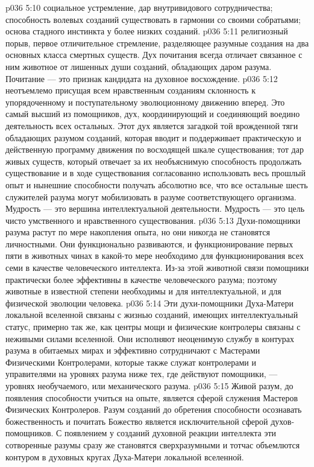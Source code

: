 \vs p036 5:10 \bibnobreakspace {} социальное устремление, дар внутривидового сотрудничества; способность волевых созданий существовать в гармонии со своими собратьями; основа стадного инстинкта у более низких созданий.
\vs p036 5:11 \bibnobreakspace {} религиозный порыв, первое отличительное стремление, разделяющее разумные создания на два основных класса смертных существ. Дух почитания всегда отличает связанное с ним животное от лишенных души созданий, обладающих даром разума. Почитание --- это признак кандидата на духовное восхождение.
\vs p036 5:12 \bibnobreakspace {} неотъемлемо присущая всем нравственным созданиям склонность к упорядоченному и поступательному эволюционному движению вперед. Это самый высший из помощников, дух, координирующий и соединяющий воедино деятельность всех остальных. Этот дух является загадкой той врожденной тяги обладающих разумом созданий, которая вводит и поддерживает практическую и действенную программу движения по восходящей шкале существования; тот дар живых существ, который отвечает за их необъяснимую способность продолжать существование и в ходе существования согласованно использовать весь прошлый опыт и нынешние способности получать абсолютно все, что все остальные шесть служителей разума могут мобилизовать в разуме соответствующего организма. Мудрость --- это вершина интеллектуальной деятельности. Мудрость --- это цель чисто умственного и нравственного существования.
\vs p036 5:13 \pc Духи\hyp{}помощники разума растут по мере накопления опыта, но они никогда не становятся личностными. Они функционально развиваются, и функционирование первых пяти в животных чинах в какой\hyp{}то мере необходимо для функционирования всех семи в качестве человеческого интеллекта. Из\hyp{}за этой животной связи помощники практически более эффективны в качестве человеческого разума; поэтому животные в известной степени необходимы и для интеллектуальной, и для физической эволюции человека.
\vs p036 5:14 Эти духи\hyp{}помощники Духа\hyp{}Матери локальной вселенной связаны с жизнью созданий, имеющих интеллектуальный статус, примерно так же, как центры мощи и физические контролеры связаны с неживыми силами вселенной. Они исполняют неоценимую службу в контурах разума в обитаемых мирах и эффективно сотрудничают с Мастерами Физическими Контролерами, которые также служат контролерами и управителями на уровнях разума ниже тех, где действуют помощники, --- уровнях необучаемого, или механического разума.
\vs p036 5:15 Живой разум, до появления способности учиться на опыте, является сферой служения Мастеров Физических Контролеров. Разум созданий до обретения способности осознавать божественность и почитать Божество является исключительной сферой духов\hyp{}помощников. С появлением у созданий духовной реакции интеллекта эти сотворенные разумы сразу же становятся сверхразумными и тотчас объемлются контуром в духовных кругах Духа\hyp{}Матери локальной вселенной.
